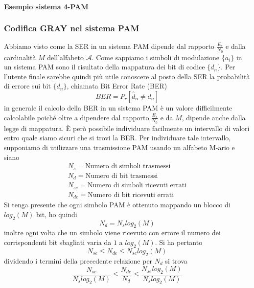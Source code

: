             \paragraph{Esempio sistema 4-PAM}{

            }
        \subsubsection{Codifica GRAY nel sistema PAM}
            Abbiamo visto come la SER in un sistema PAM dipende dal rapporto $\frac{E_s}{N_0}$ e dalla cardinalità 
            $M$ dell'alfabeto $\mathcal{A}$. Come sappiamo i simboli di modulazione $\{a_i\}$ in un sistema PAM sono
            il risultato della mappatura dei bit di codice $\{d_n\}$. Per l'utente finale sarebbe quindi più utile 
            conoscere al posto della SER la probabilità di errore sui bit $\{d_n\}$, chiamata Bit Error Rate (BER)
            \[
                BER = P_r[\hat{d}_n \neq d_n]    
            \] 
            in generale il calcolo della BER in un sistema PAM è un valore difficilmente calcolabile poiché oltre a dipendere
            dal rapporto $\frac{E_s}{N_0}$ e da $M$, dipende anche dalla legge di mappatura. È però possibile 
            individuare facilmente un intervallo di valori entro quale siamo sicuri che si trovi la BER.
            Per individuare tale intervallo, supponiamo di utilizzare una trasmissione PAM usando un alfabeto
            M-ario e siano
            \begin{gather}
                N_s = \text{Numero di simboli trasmessi}\nonumber \\
                N_d = \text{Numero di bit trasmessi}\nonumber \\
                N_{se} = \text{Numero di simboli ricevuti errati}\nonumber \\
                N_{de} = \text{Numero di bit ricevuti errati}\nonumber 
            \end{gather}
            Si tenga presente che ogni simbolo PAM è ottenuto mappando un blocco di $log_2(M)$ bit, ho quindi
            \[
                N_d = N_slog_2(M)    
            \]
            inoltre ogni volta che un simbolo viene ricevuto con errore il numero dei corrispondenti bit sbagliati 
            varia da $1$ a $log_2(M)$. Si ha pertanto 
            \[
                N_{se} \leq N_{de} \leq N_{se} log_2(M)    
            \]
            dividendo i termini della precedente relazione per $N_d$ si trova
            \[
                \frac{N_{se}}{N_slog_2(M)} \leq \frac{N_{de}}{N_{d}} \leq \frac{N_{se} log_2(M)}{N_{s} log_2(M)}    
            \]
